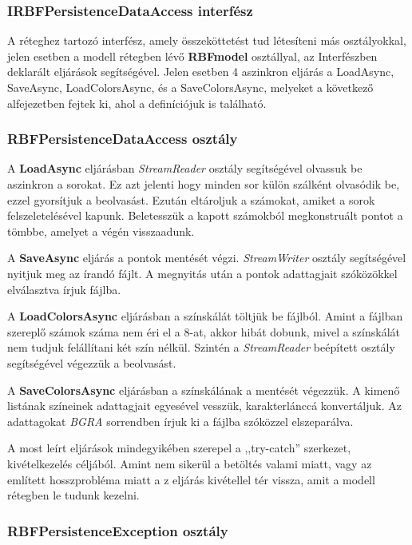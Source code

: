 			\subsubsection{IRBFPersistenceDataAccess interfész}
			
				A réteghez tartozó interfész, amely összeköttetést tud létesíteni más osztályokkal, jelen esetben a modell rétegben lévő \textbf{RBFmodel} osztállyal, az Interfészben deklarált eljárások segítségével. Jelen esetben 4 aszinkron eljárás a LoadAsync, SaveAsync, LoadColorsAsync, és a SaveColorsAsync, melyeket a következő alfejezetben fejtek ki, ahol a definíciójuk is található.
				
			\subsubsection{RBFPersistenceDataAccess osztály}
			
				A \textbf{LoadAsync} eljárásban \textit{StreamReader} osztály segítségével olvassuk be aszinkron a sorokat. Ez azt jelenti hogy minden sor külön szálként olvasódik be, ezzel gyorsítjuk a beolvasást. Ezután eltároljuk a számokat, amiket a sorok felszeletelésével kapunk. Beletesszük a kapott számokból megkonstruált pontot a tömbbe, amelyet a végén visszaadunk. 
				
				A \textbf{SaveAsync} eljárás a pontok mentését végzi. \textit{StreamWriter} osztály segítségével nyitjuk meg az írandó fájlt. A megnyitás után a pontok adattagjait szóközökkel elválasztva írjuk fájlba.
				
				A \textbf{LoadColorsAsync} eljárásban a színskálát töltjük be fájlból. Amint a fájlban szereplő számok száma nem éri el a 8-at, akkor hibát dobunk, mivel a színskálát nem tudjuk felállítani két szín nélkül. Szintén a \textit{StreamReader} beépített osztály segítségével végezzük a beolvasást.
				
				A \textbf{SaveColorsAsync} eljárásban a színskálának a mentését végezzük. A kimenő listának színeinek adattagjait egyesével vesszük, karakterlánccá konvertáljuk. Az adattagokat \textit{BGRA} sorrendben írjuk ki a fájlba szóközzel elszeparálva.
				
				A most leírt eljárások mindegyikében szerepel a ,,try-catch'' szerkezet, kivételkezelés céljából. Amint nem sikerül a betöltés valami miatt, vagy az említett hosszprobléma miatt a  z eljárás kivétellel tér vissza, amit a modell rétegben le tudunk kezelni.
				
			\subsubsection{RBFPersistenceException osztály}
			
